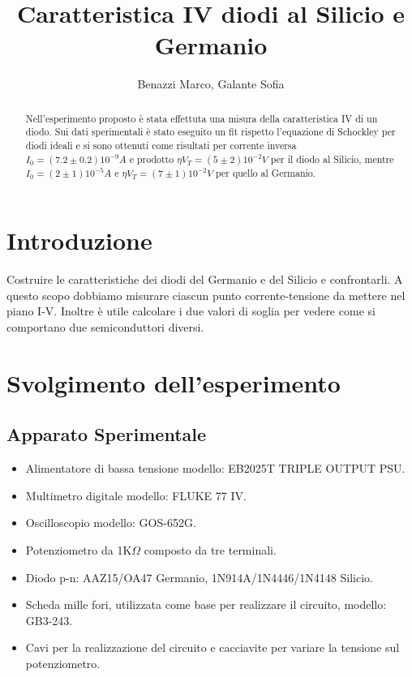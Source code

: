 \documentclass{article}
\title{Caratteristica IV diodi al Silicio e Germanio}
\author{Benazzi Marco, Galante Sofia}
\begin{document}
\maketitle

\begin{abstract}
Nell'esperimento proposto è stata effettuta una misura della caratteristica IV di un diodo. Sui dati sperimentali è stato eseguito un fit rispetto l'equazione di Schockley per diodi ideali e si sono ottenuti come risultati per corrente inversa $I_0=(7.2 \pm 0.2)10^{-9} A$ e prodotto $ \eta V_T =(5 \pm 2)10^{-2}V$ per il diodo al Silicio, mentre $I_0=(2\pm1)10^{-5}A$ e $ \eta V_T=(7 \pm 1)10^{-2}V$ per quello al Germanio. 
\end{abstract}

\section{Introduzione}
Costruire le caratteristiche dei diodi del Germanio e del Silicio e confrontarli. A questo scopo dobbiamo misurare ciascun punto corrente-tensione da mettere nel piano I-V. Inoltre è utile calcolare i due valori di soglia per vedere come si comportano due semiconduttori diversi.

\section{Svolgimento dell'esperimento}
\subsection{Apparato Sperimentale}
\begin{itemize}
\item Alimentatore di bassa tensione modello: EB2025T TRIPLE OUTPUT PSU.
\item Multimetro digitale modello: FLUKE 77 IV.
\item Oscilloscopio modello: GOS-652G.
\item Potenziometro da 1K$\Omega$ composto da tre terminali.                        
\item Diodo p-n: AAZ15/OA47 Germanio, 1N914A/1N4446/1N4148 Silicio.
\item Scheda mille fori, utilizzata come base per realizzare il circuito, modello: GB3-243.
\item Cavi per la realizzazione del circuito e cacciavite per variare la tensione sul potenziometro.
\end{itemize}
\end{document}
